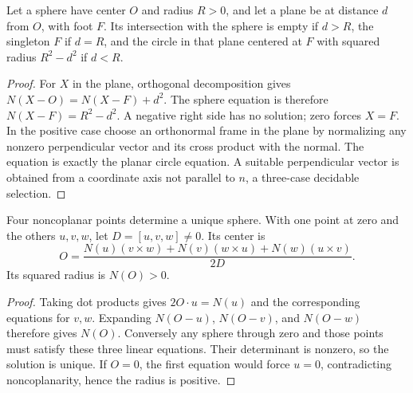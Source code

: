 \begin{theorem}\label{sol:sphere-section}
Let a sphere have center $O$ and radius $R>0$, and let a plane be at
distance $d$ from $O$, with foot $F$. Its intersection with the sphere
is empty if $d>R$, the singleton $F$ if $d=R$, and the circle in
that plane centered at $F$ with squared radius $R^2-d^2$ if $d<R$.
\end{theorem}
\begin{proof}
For $X$ in the plane, orthogonal decomposition gives
$N(X-O)=N(X-F)+d^2$. The sphere equation is therefore
$N(X-F)=R^2-d^2$. A negative right side has no solution; zero
forces $X=F$. In the positive case choose an orthonormal frame in
the plane by normalizing any nonzero perpendicular vector and its
cross product with the normal. The equation is exactly the planar
circle equation. A suitable perpendicular vector is obtained from a
coordinate axis not parallel to $n$, a three-case decidable selection.
\end{proof}

\begin{theorem}\label{sol:circumsphere}
Four noncoplanar points determine a unique sphere. With one point at
zero and the others $u,v,w$, let $D=[u,v,w]\ne0$. Its center is
\[
 O=\frac{N(u)(v\times w)+N(v)(w\times u)+N(w)(u\times v)}{2D}.
\]
Its squared radius is $N(O)>0$.
\end{theorem}
\begin{proof}
Taking dot products gives $2O\cdot u=N(u)$ and the corresponding
equations for $v,w$. Expanding $N(O-u)$, $N(O-v)$, and $N(O-w)$
therefore gives $N(O)$. Conversely any sphere through zero and those
points must satisfy these three linear equations. Their determinant
is nonzero, so the solution is unique. If $O=0$, the first equation
would force $u=0$, contradicting noncoplanarity, hence the radius is positive.
\end{proof}


